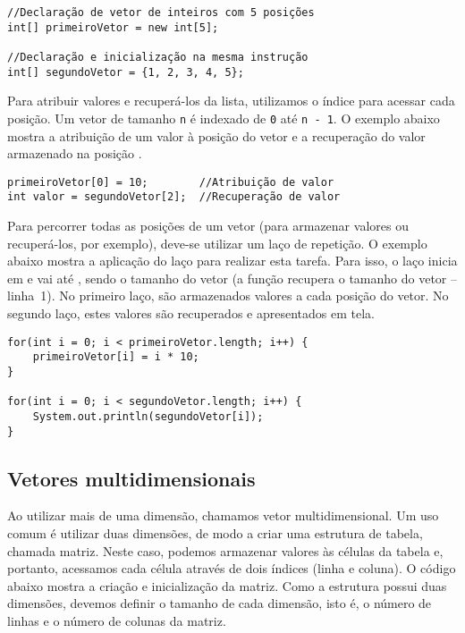 \begin{verbatim}
//Declaração de vetor de inteiros com 5 posições
int[] primeiroVetor = new int[5];

//Declaração e inicialização na mesma instrução
int[] segundoVetor = {1, 2, 3, 4, 5};
\end{verbatim}

Para atribuir valores e recuperá-los da lista, utilizamos o índice para acessar cada posição. Um vetor de tamanho \texttt{n} é indexado de \texttt{0} até \texttt{n - 1}. O exemplo abaixo mostra a atribuição de um valor à posição  do vetor e a recuperação do valor armazenado na posição .

\begin{verbatim}
primeiroVetor[0] = 10;        //Atribuição de valor
int valor = segundoVetor[2];  //Recuperação de valor
\end{verbatim}

Para percorrer todas as posições de um vetor (para armazenar valores ou recuperá-los, por exemplo), deve-se utilizar um laço de repetição. O exemplo abaixo mostra a aplicação do laço  para realizar esta tarefa. Para isso, o laço inicia em  e vai até , sendo  o tamanho do vetor (a função  recupera o tamanho do vetor -- linha~1). No primeiro laço, são armazenados valores a cada posição do vetor. No segundo laço, estes valores são recuperados e apresentados em tela.

\begin{verbatim}
for(int i = 0; i < primeiroVetor.length; i++) {
	primeiroVetor[i] = i * 10;
}

for(int i = 0; i < segundoVetor.length; i++) {
	System.out.println(segundoVetor[i]);
}
\end{verbatim}

\subsection{Vetores multidimensionais}
Ao utilizar mais de uma dimensão, chamamos vetor multidimensional. Um uso comum é utilizar duas dimensões, de modo a criar uma estrutura de tabela, chamada matriz. Neste caso, podemos armazenar valores às células da tabela e, portanto, acessamos cada célula através de dois índices (linha e coluna). O código abaixo mostra a criação e inicialização da matriz. Como a estrutura possui duas dimensões, devemos definir o tamanho de cada dimensão, isto é, o número de linhas e o número de colunas da matriz.

